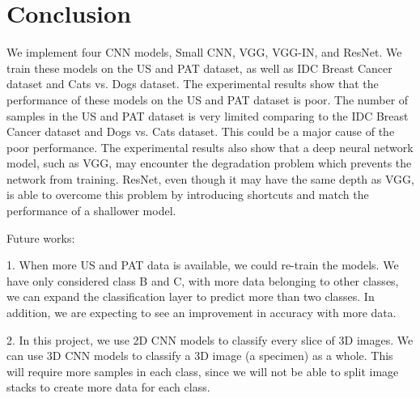 \chapter{Conclusion} 
\label{conclusion}

We implement four CNN models, Small CNN, VGG, VGG-IN, and ResNet. We train these models on the US and PAT dataset, as well as IDC Breast Cancer dataset and Cats vs. Dogs dataset. The experimental results show that the performance of these models on the US and PAT dataset is poor. The number of samples in the US and PAT dataset is very limited comparing to the IDC Breast Cancer dataset and Dogs vs. Cats dataset. This could be a major cause of the poor performance. The experimental results also show that a deep neural network model, such as VGG, may encounter the degradation problem which prevents the network from training. ResNet, even though it may have the same depth as VGG, is able to overcome this problem by introducing shortcuts and match the performance of a shallower model. 

Future works:

1. When more US and PAT data is available, we could re-train the models. We have only considered class B and C, with more data belonging to other classes, we can expand the classification layer to predict more than two classes. In addition, we are expecting to see an improvement in accuracy with more data.

2. In this project, we use 2D CNN models to classify every slice of 3D images. We can use 3D CNN models to classify a 3D image (a specimen) as a whole. This will require more samples in each class, since we will not be able to split image stacks to create more data for each class.